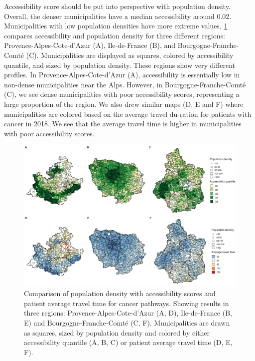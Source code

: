 Accessibility score should be put into perspective with population density. Overall, the denser municipalities have a median accessibility around 0.02. Municipalities with low population densities have more extreme values.  \cref{fig:accessibility-vs-density} compares accessibility and population density for three different regions: Provence-Alpes-Cote-d'Azur (A), Ile-de-France (B), and Bourgogne-Franche-Comté (C). Municipalities are displayed as squares, colored by accessibility quantile, and sized by population density. These regions show very different profiles. In Provence-Alpes-Cote-d'Azur (A), accessibility is essentially low in non-dense municipalities near the Alps. However, in Bourgogne-Franche-Comté (C), we see dense municipalities with poor accessibility scores, representing a large proportion of the region. We also drew similar maps (D, E and F) where municipalities are colored based on the average travel du-ration for patients with cancer in 2018. We see that the average travel time is higher in municipalities with poor accessibility scores.

\begin{figure}[h]
    \includegraphics[width=\textwidth]{images/camion/fig3_accessibility_vs_density_scatter_map.png}
    \centering
    \caption{
        Comparison of population density with accessibility scores and patient average travel time for cancer pathways. Showing results in three regions: Provence-Alpes-Cote-d’Azur (A, D), Ile-de-France (B, E) and Bourgogne-Franche-Comté (C, F). Municipalities are drawn as squares, sized by population density and colored by either accessibility quantile (A, B, C) or patient average travel time (D, E, F).
    }
    \label{fig:accessibility-vs-density}
\end{figure}

